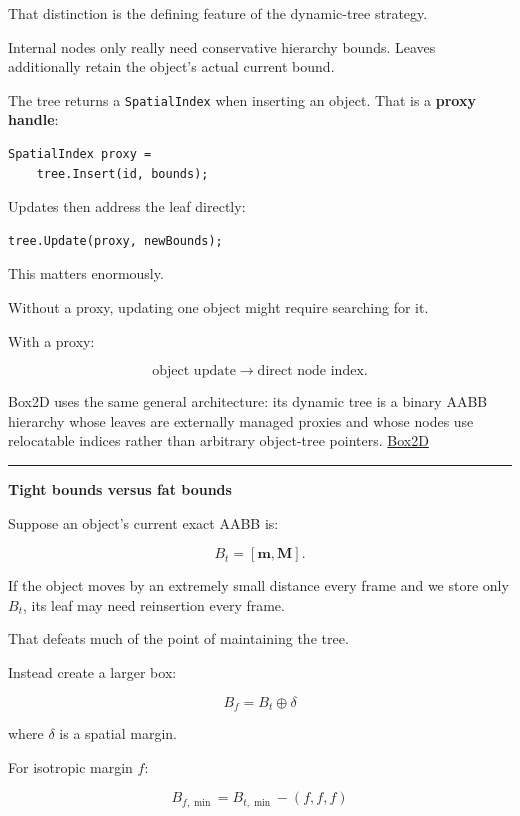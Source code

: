 That distinction is the defining feature of the dynamic-tree strategy.

Internal nodes only really need conservative hierarchy bounds. Leaves additionally retain the object's actual current bound.

The tree returns a \texttt{SpatialIndex} when inserting an object. That is a \textbf{proxy handle}:

\begin{verbatim}
SpatialIndex proxy =
    tree.Insert(id, bounds);
\end{verbatim}

Updates then address the leaf directly:

\begin{verbatim}
tree.Update(proxy, newBounds);
\end{verbatim}

This matters enormously.

Without a proxy, updating one object might require searching for it.

With a proxy:

\[
\text{object update}
\rightarrow
\text{direct node index}.
\]

Box2D uses the same general architecture: its dynamic tree is a binary AABB hierarchy whose leaves are externally managed proxies and whose nodes use relocatable indices rather than arbitrary object-tree pointers. \href{https://box2d.org/documentation/group__tree.html?utm_source=chatgpt.com}{Box2D}

\begin{center}\rule{0.5\linewidth}{0.5pt}\end{center}

\textbf{Tight bounds versus fat bounds}

Suppose an object's current exact AABB is:

\[
B_t=
[\mathbf m,\mathbf M].
\]

If the object moves by an extremely small distance every frame and we store only \(B_t\), its leaf may need reinsertion every frame.

That defeats much of the point of maintaining the tree.

Instead create a larger box:

\[
B_f=B_t\oplus \delta
\]

where \(\delta\) is a spatial margin.

For isotropic margin \(f\):

\[
B_{f,\min}
=
B_{t,\min}-(f,f,f)
\]

